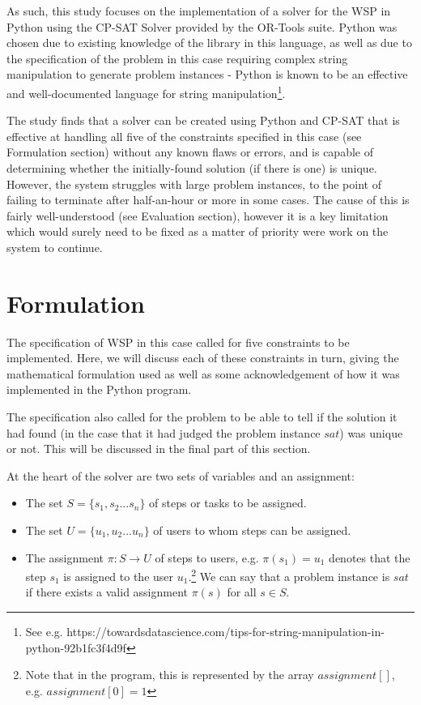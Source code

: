 \documentclass[11pt]{article}
\begin{document}
		As such, this study focuses on the implementation of a solver for the WSP
		in Python using the CP-SAT Solver provided by the OR-Tools suite. Python
		was chosen due to existing knowledge of the library in this language,
		as well as due to the specification of the problem in this case requiring
		complex string manipulation to generate problem instances - Python is
		known to be an effective and well-documented language for string
		manipulation\footnote{See e.g. https://towardsdatascience.com/tips-for-string-manipulation-in-python-92b1fc3f4d9f}.

		The study finds that a solver can be created using Python and CP-SAT that
		is effective at handling all five of the constraints specified in this case (see Formulation section)
		without any known flaws or errors, and is capable of determining whether
		the initially-found solution (if there is one) is unique. However, the
		system struggles with large problem instances, to the point of failing to
		terminate after half-an-hour or more in some cases. The cause of this is
		fairly well-understood (see Evaluation section), however it is a key limitation
		which would surely need to be fixed as a matter of priority were work on
		the system to continue.

	\section{Formulation}

		The specification of WSP in this case called for five constraints to be implemented.
		Here, we will discuss each of these constraints in turn, giving the mathematical
		formulation used as well as some acknowledgement of how it was implemented in the
		Python program.

		The specification also called for the problem to be able to tell if the solution
		it had found (in the case that it had judged the problem instance \(sat\)) was
		unique or not. This will be discussed in the final part of this section.

		At the heart of the solver are two sets of variables and an assignment:

		\begin{itemize}
			\item The set \(S = \{s_1, s_2... s_n\}\) of steps or tasks to be assigned.
			\item The set \(U = \{u_1, u_2... u_n\}\) of users to whom steps can be assigned.
			\item The assignment \(\pi : S \rightarrow U\) of steps to users, e.g. \(\pi(s_1) = u_1\) denotes that the step \(s_1\) is assigned to the user \(u_1\).\footnote{Note that in the program, this is represented by the array \(assignment[]\), e.g. \(assignment[0]=1\)} We can say that a problem instance is \(sat\) if there exists a valid assignment \(\pi(s)\) for all \(s \in S\).
		\end{itemize}
\end{document}
